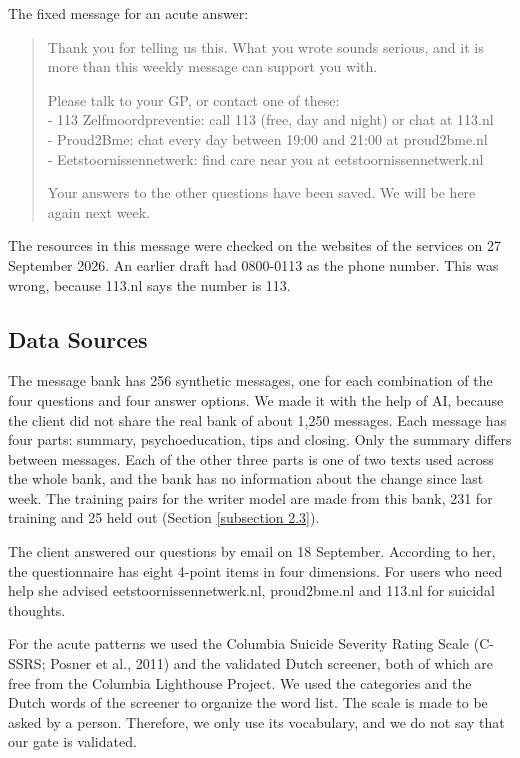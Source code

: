 \documentclass[a4paper]{article}
\begin{document}
The fixed message for an acute answer:
\begin{quote}
Thank you for telling us this. What you wrote sounds serious, and it is more than this weekly message can support you with.

Please talk to your GP, or contact one of these: \\
- 113 Zelfmoordpreventie: call 113 (free, day and night) or chat at 113.nl \\
- Proud2Bme: chat every day between 19:00 and 21:00 at proud2bme.nl \\
- Eetstoornissennetwerk: find care near you at eetstoornissennetwerk.nl

Your answers to the other questions have been saved. We will be here again next week.
\end{quote}
The resources in this message were checked on the websites of the services on 27 September 2026. An earlier draft had 0800-0113 as the phone number. This was wrong, because 113.nl says the number is 113.

\subsection{Data Sources}
The message bank has 256 synthetic messages, one for each combination of the four questions and four answer options. We made it with the help of AI, because the client did not share the real bank of about 1,250 messages. Each message has four parts: summary, psychoeducation, tips and closing. Only the summary differs between messages. Each of the other three parts is one of two texts used across the whole bank, and the bank has no information about the change since last week. The training pairs for the writer model are made from this bank, 231 for training and 25 held out (Section \ref{subsection 2.3}).

The client answered our questions by email on 18 September. According to her, the questionnaire has eight 4-point items in four dimensions. For users who need help she advised eetstoornissennetwerk.nl, proud2bme.nl and 113.nl for suicidal thoughts.

For the acute patterns we used the Columbia Suicide Severity Rating Scale (C-SSRS; Posner et al., 2011) and the validated Dutch screener, both of which are free from the Columbia Lighthouse Project. We used the categories and the Dutch words of the screener to organize the word list. The scale is made to be asked by a person. Therefore, we only use its vocabulary, and we do not say that our gate is validated.
\end{document}
